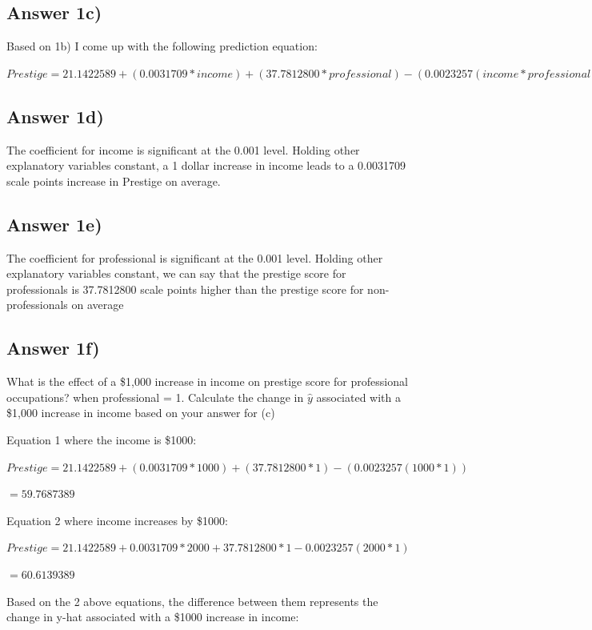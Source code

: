 \documentclass{article}
\begin{document}
\pagebreak
\subsection{Answer 1c)}
Based on 1b)
I come up with the following prediction equation:
\vspace{0.2cm}

\noindent $Prestige = 21.1422589 + (0.0031709*income) + (37.7812800*professional) - (0.0023257(income*professional))$

\subsection{Answer 1d)}

The coefficient for income is significant at the 0.001 level. Holding other explanatory variables constant, a 1 dollar increase in income
leads to a 0.0031709 scale points increase in Prestige on average. 

\subsection{Answer 1e)}

The coefficient for professional is significant at the 0.001 level.
Holding other explanatory variables constant, we can say that the
prestige score for professionals is 37.7812800 scale points higher than 
the prestige score for non-professionals on average

\subsection{Answer 1f)}
What is the effect of a \$1,000 increase in income on prestige score for professional occupations? when professional = 1.
Calculate the change in $\hat{y}$ associated with a \$1,000 increase in income based on your answer for (c)

\vspace{0.2cm}
Equation 1 where the income is \$1000:

\noindent $Prestige = 21.1422589 + (0.0031709*1000) + (37.7812800*1)  - (0.0023257(1000*1))$

$= 59.7687389$
    
Equation 2 where income increases by \$1000:

\noindent $Prestige = 21.1422589 + 0.0031709*2000 + 37.7812800*1 -0.0023257(2000*1)$

$= 60.6139389$    


\noindent Based on the 2 above equations, the difference between them represents the 
change in y-hat associated with a \$1000 increase in income:
\vspace{0.1cm}
\end{document}
